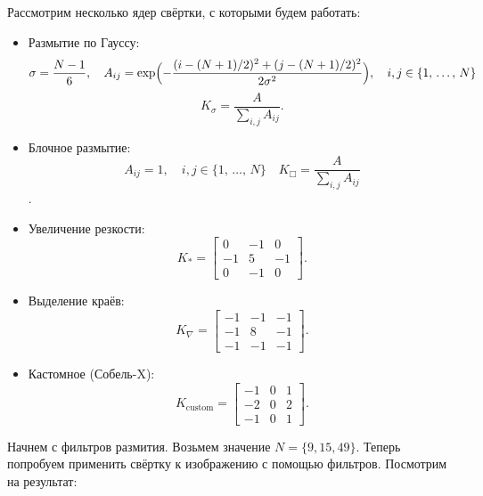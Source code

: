 \documentclass[a4paper]{article}
\begin{document}
Рассмотрим несколько ядер свёртки, с которыми будем работать:
\begin{itemize}
  \item Размытие по Гауссу:
    \[
      \sigma=\frac{N-1}{6},\quad
      A_{ij}=\exp\Bigl(-\frac{(i-(N+1)/2)^2+(j-(N+1)/2)^2}{2\sigma^2}\Bigr), \quad i, j \in \{1,\, \dots,\, N\} 
    \]
    \[
      K_\sigma = \frac{A}{\sum_{i,j} A_{ij}}.
    \]
  \item Блочное размытие: 
    \[A_{ij}=1, \quad i, j \in \{1,\, \dots,\, N\} \quad K_\Box=\frac{A}{\sum_{i,j}A_{ij}}\].
  \item Увеличение резкости:
    \[ K_*=\begin{bmatrix}0&-1&0\\-1&5&-1\\0&-1&0\end{bmatrix}.\]
  \item Выделение краёв:
    \[ K_\nabla=\begin{bmatrix}-1&-1&-1\\-1&8&-1\\-1&-1&-1\end{bmatrix}.\]
  \item Кастомное (Собель-X):
    \[ K_{\mathrm{custom}}=\begin{bmatrix}-1&0&1\\-2&0&2\\-1&0&1\end{bmatrix}.\]
\end{itemize}

Начнем с фильтров размития. Возьмем значение $N=\{9, 15, 49\}$. Теперь попробуем применить свёртку к изображению с помощью фильтров. Посмотрим на результат:
\end{document}
